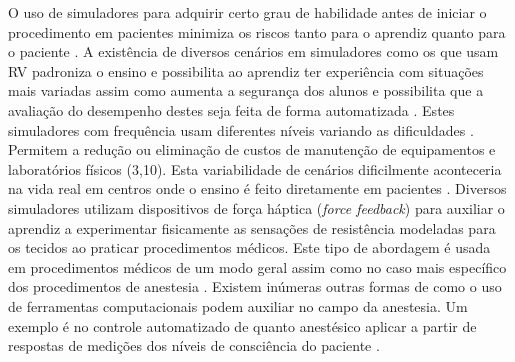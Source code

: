 O uso de simuladores para adquirir certo grau de habilidade antes de iniciar o procedimento em pacientes minimiza os riscos tanto para o aprendiz quanto para o paciente \cite{Coles2011, Akhtar2014}. A existência de diversos cenários em simuladores como os que usam \acrfull{RV} padroniza o ensino e possibilita ao aprendiz ter experiência com situações mais variadas assim como aumenta a segurança dos alunos e possibilita que a avaliação do desempenho destes seja feita de forma automatizada \cite{Willis2014}. Estes simuladores com frequência usam diferentes níveis variando as dificuldades \cite{Ullrich2012}. Permitem a redução ou eliminação de custos de manutenção de equipamentos e laboratórios físicos (3,10). 
Esta variabilidade de cenários dificilmente aconteceria na vida real em centros onde o ensino é feito diretamente em pacientes \cite{Udani2015}. Diversos simuladores utilizam dispositivos de força háptica (\textit{force feedback}) para auxiliar o aprendiz a experimentar fisicamente as sensações de resistência modeladas para os tecidos ao praticar procedimentos médicos. Este tipo de abordagem é usada em procedimentos médicos de um modo geral \cite{Escobar-Castillejos2016} assim como no caso mais específico dos procedimentos de anestesia \cite{Vaughan2013}. Existem inúmeras outras formas de como o uso de ferramentas computacionais podem auxiliar no campo da anestesia. Um exemplo é no controle automatizado de quanto anestésico aplicar a partir de respostas de medições dos níveis de consciência do paciente \cite{Mendez2009}.

